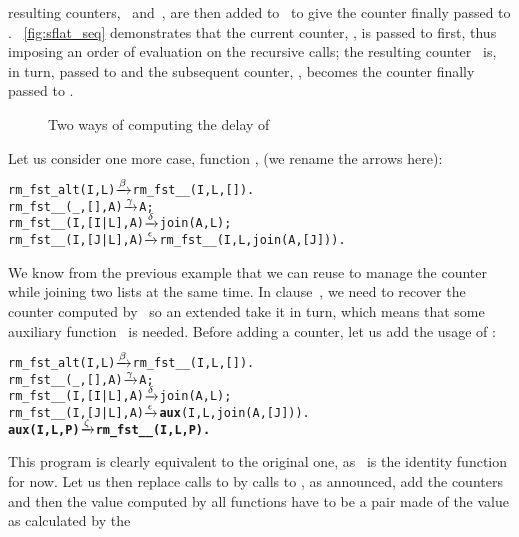resulting counters, ~and~, are then added
to~ to give the counter finally passed to
. \Fig~\vref{fig:sflat_seq} demonstrates that the
current counter, , is passed to 
first, thus imposing an order of evaluation on the recursive calls;
the resulting counter~ is, in turn, passed
to  and the subsequent counter, ,
becomes the counter finally passed to .
\begin{figure}[t]
\centering
{}
\quad
{}
\caption{Two ways of computing the delay of 
\label{fig:sflat_delay}}
\end{figure}
Let us consider one more case, function ,
 (we rename the arrows here):
\begin{alltt}
rm_fst_alt(I,L)     \(\smashedrightarrow{\beta}\) rm_fst__(I,L,[]).
rm_fst__(_,   [],A) \(\smashedrightarrow{\gamma}\) A;
rm_fst__(I,[I|L],A) \(\smashedrightarrow{\delta}\) join(A,L);
rm_fst__(I,[J|L],A) \(\smashedrightarrow{\epsilon}\) rm_fst__(I,L,join(A,[J])).
\end{alltt}
We know from the previous example that we can reuse 
to manage the counter while joining two lists at the same time. In
clause~\clause{\epsilon}, we need to recover the counter computed
by~ so an extended  take it in
turn, which means that some auxiliary function~ is
needed. Before adding a counter, let us add the usage of
:
\begin{alltt}
rm_fst_alt(I,L)     \(\smashedrightarrow{\beta}\) rm_fst__(I,L,[]).
rm_fst__(_,   [],A) \(\smashedrightarrow{\gamma}\) A;
rm_fst__(I,[I|L],A) \(\smashedrightarrow{\delta}\) join(A,L);
rm_fst__(I,[J|L],A) \(\smashedrightarrow{\epsilon}\) \textbf{aux}(I,L,join(A,[J])).
\textbf{aux(I,L,P)          \(\smashedrightarrow{\zeta}\) rm_fst__(I,L,P).}
\end{alltt}
This program is clearly equivalent to the original one,
as~ is the identity function for now. Let us then
replace calls to  by calls to , as
announced, add the counters and then the value computed by all
functions have to be a pair made of the value as calculated by the
